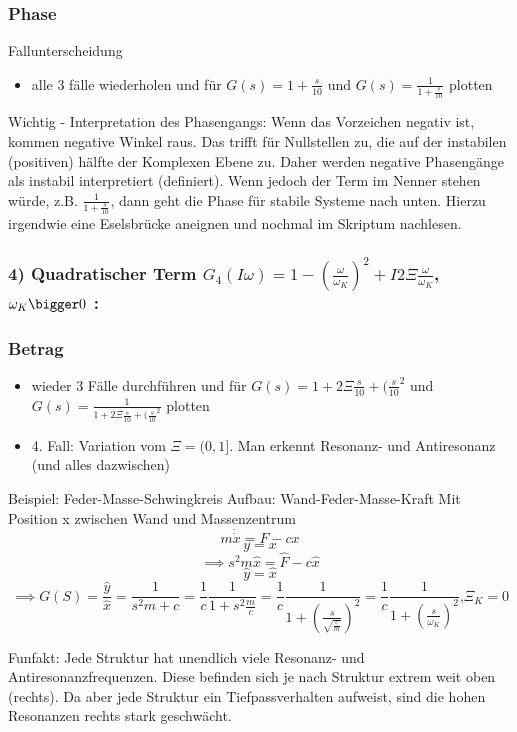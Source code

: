 \documentclass[a4paper]{article}
\begin{document}
\subsubsection*{Phase}
Fallunterscheidung
\begin{itemize}
    \item alle 3 fälle wiederholen und für $G(s)=1+\frac{s}{10}$ und $G(s)=\frac{1}{1+\frac{s}{10}}$ plotten
\end{itemize}
Wichtig - Interpretation des Phasengangs: Wenn das Vorzeichen negativ ist, kommen negative Winkel raus. Das trifft für Nullstellen zu, die auf der instabilen (positiven) hälfte der Komplexen Ebene zu. Daher werden negative Phasengänge als instabil interpretiert (definiert).
Wenn jedoch der Term im Nenner stehen würde, z.B. $\frac{1}{1+\frac{s}{10}}$, dann geht die Phase für stabile Systeme nach unten.\newline
Hierzu irgendwie eine Eselsbrücke aneignen und nochmal im Skriptum nachlesen.

\subsubsection*{4) Quadratischer Term $G_{4}(I\omega)=1-(\frac{\omega}{\omega_{K}})^{2}+I2\Xi\frac{\omega}{ \omega_{K}}$, $\omega_{K}\bigger0$ :}
\subsubsection*{Betrag}
\begin{itemize}
    \item wieder 3 Fälle durchführen und für $G(s)=1+2\Xi\frac{s}{10} +(\frac{s}{10}^{2}$ und $G(s)=\frac{1}{1+2\Xi\frac{s}{10} +(\frac{s}{10}^{2}}$ plotten
    \item 4. Fall: Variation vom $\Xi=(0, 1]$. Man erkennt Resonanz- und Antiresonanz (und alles dazwischen)
\end{itemize}
Beispiel: Feder-Masse-Schwingkreis
Aufbau: Wand-Feder-Masse-Kraft
Mit Position x zwischen Wand und Massenzentrum
\[ m \dot\dot x = F-cx \]
\[ y=x \]
\[ \implies s^{2}m \hat{x}=\hat{F}-c \hat{x} \]
\[ \hat{y}=\hat{x} \]
\[ \implies G(S)=\frac{\hat{y}}{\hat{x}}=\frac{1}{s^{2}m+c}=\frac{1}{c}\frac{1}{1+s^{2}\frac{m}{c}}=\frac{1}{c}\frac{1}{1+(\frac{s}{\sqrt{\frac{c}{m}} })^{2}}=\frac{1}{c}\frac{1}{1+(\frac{s}{\omega_{K}})^{2}}\text{,} \Xi_{K}=0\]

Funfakt: Jede Struktur hat unendlich viele Resonanz- und Antiresonanzfrequenzen. Diese befinden sich je nach Struktur extrem weit oben (rechts). Da aber jede Struktur ein Tiefpassverhalten aufweist, sind die hohen Resonanzen rechts stark geschwächt. 
\end{document}
